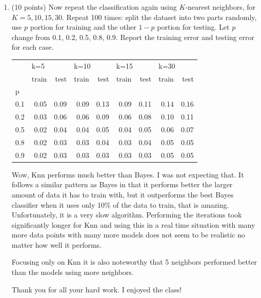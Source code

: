 \documentclass[a4paper,12pt,fleqn]{article}
\begin{document}
\begin{enumerate}
\item (10 points) Now repeat the classification again using $K$-nearest neighbors, for $K = 5, 10, 15, 30$.  Repeat 100 times: split the dataset into two parts randomly, use $p$ portion for training and the other $1 - p$ portion for testing. Let $p$ change from 0.1, 0.2, 0.5, 0.8, 0.9. Report the training error and testing error for each case.

\vspace{.15in}
\begin{tabular}{lrrrrrrrr}
\toprule
{} & \multicolumn{2}{l}{k=5} & \multicolumn{2}{l}{k=10} & \multicolumn{2}{l}{k=15} & \multicolumn{2}{l}{k=30} \\
{} & train &  test & train &  test & train &  test & train &  test \\
p   &       &       &       &       &       &       &       &       \\
\midrule
0.1 &  0.05 &  0.09 &  0.09 &  0.13 &  0.09 &  0.11 &  0.14 &  0.16 \\
0.2 &  0.03 &  0.06 &  0.06 &  0.09 &  0.06 &  0.08 &  0.10 &  0.11 \\
0.5 &  0.02 &  0.04 &  0.04 &  0.05 &  0.04 &  0.05 &  0.06 &  0.07 \\
0.8 &  0.02 &  0.03 &  0.03 &  0.04 &  0.03 &  0.04 &  0.05 &  0.05 \\
0.9 &  0.02 &  0.03 &  0.03 &  0.03 &  0.03 &  0.03 &  0.05 &  0.05 \\
\bottomrule
\end{tabular}
\vspace{.15in}

Wow, Knn performs much better than Bayes.  I was not expecting that.  It follows a similar pattern as Bayes in that it performs better the larger amount of data it has to train with, but it outperforms the best Bayes classifier when it uses only 10\% of the data to train, that is amazing.  Unfortunately, it is a very slow algorithm.  Performing the iterations took significantly longer for Knn and using this in a real time situation with many more data points with many more models does not seem to be realistic no matter how well it performs.


Focusing only on Knn it is also noteworthy that 5 neighbors performed better than the models using more neighbors.  

\vspace{.25in}

Thank you for all your hard work.  I enjoyed the class!  \smiley{}

\end{enumerate}




\label{finalpage}
\end{document}

